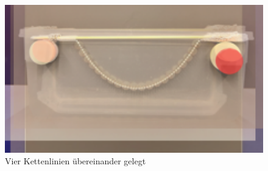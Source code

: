 \begin{figure}
	\centering
	\includegraphics[width=1\textwidth]{papers/kettenlinie/images/kettenlinie_merged.png}
	\caption{Vier Kettenlinien übereinander gelegt}
	\label{fig:Kettenlinie-Merged}
\end{figure}
